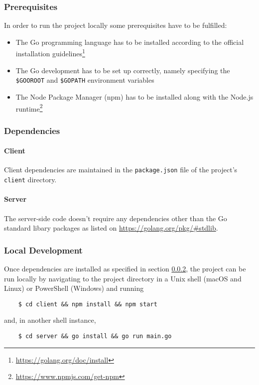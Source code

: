 \subsubsection{Prerequisites}
In order to run the project locally some prerequisites have to be fulfilled:
\begin{itemize}
    \item The Go programming language has to be installed according to the official installation guidelines\footnote{\url{https://golang.org/doc/install}}
    \item The Go development has to be set up correctly, namely specifying the \texttt{\$GOOROOT} and \texttt{\$GOPATH} environment variables
    \item The Node Package Manager (npm) has to be installed along with the Node.js runtime\footnote{\url{https://www.npmjs.com/get-npm}}
\end{itemize}

\subsubsection{Dependencies}
\label{subsub:dependencies}

\paragraph{Client}
Client dependencies are maintained in the \texttt{package.json} file of the project's \texttt{client} directory.

\paragraph{Server}
The server-side code doesn't require any dependencies other than the Go standard libary packages as listed on \url{https://golang.org/pkg/#stdlib}.

\subsubsection{Local Development}
Once dependencies are installed as specified in section \ref{subsub:dependencies}, the project can be run locally by navigating to the project directory in a Unix shell (macOS and Linux) or PowerShell (Windows) and running

\begin{verbatim}
    $ cd client && npm install && npm start
\end{verbatim}
and, in another shell instance,
\begin{verbatim}
    $ cd server && go install && go run main.go
\end{verbatim}

